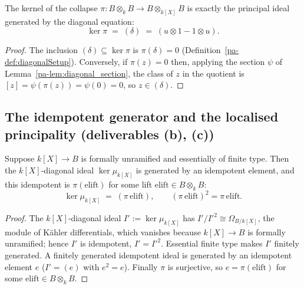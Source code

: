 \begin{theorem}
  \label{pa-thm:ker_baseChange}
  \leanok

  The kernel of the collapse \(\pi \colon B \otimes_k B \to B \otimes_{k[X]} B\) is exactly the
  principal ideal generated by the diagonal equation:
  \[
    \ker \pi \;=\; (\delta) \;=\; (u \otimes 1 - 1 \otimes u).
  \]
\end{theorem}
\begin{proof}
  \leanok
  The inclusion \((\delta) \subseteq \ker \pi\) is \(\pi(\delta) = 0\)
  (Definition~\ref{pa-def:diagonalSetup}). Conversely, if \(\pi(z) = 0\) then, applying the section
  \(\psi\) of Lemma~\ref{pa-lem:diagonal_section}, the class of \(z\) in the quotient is \([z] =
  \psi(\pi(z)) = \psi(0) = 0\), so \(z \in (\delta)\).
\end{proof}

\subsection{The idempotent generator and the localised principality (deliverables (b), (c))}

\begin{theorem}
  \label{pa-thm:exists_idempotent_lift}
  \leanok

  Suppose \(k[X] \to B\) is formally unramified and essentially of finite type. Then the
  \(k[X]\)-diagonal ideal \(\ker \mu_{k[X]}\) is generated by an idempotent element, and this
  idempotent is \(\pi(\mathrm{elift})\) for some lift \(\mathrm{elift} \in B \otimes_k B\):
  \[
    \ker \mu_{k[X]} \;=\; (\pi\,\mathrm{elift}), \qquad (\pi\,\mathrm{elift})^2 = \pi\,\mathrm{elift}.
  \]
\end{theorem}
\begin{proof}
  \leanok
  The \(k[X]\)-diagonal ideal \(I' := \ker \mu_{k[X]}\) has \(I'/I'^2 \cong \Omega_{B/k[X]}\), the
  module of K\"ahler differentials, which vanishes because \(k[X] \to B\) is formally unramified;
  hence \(I'\) is idempotent, \(I' = I'^2\). Essential finite type makes \(I'\) finitely
  generated. A finitely generated idempotent ideal is generated by an idempotent element \(e\)
  (\(I' = (e)\) with \(e^2 = e\)). Finally \(\pi\) is surjective, so \(e = \pi(\mathrm{elift})\)
  for some \(\mathrm{elift} \in B \otimes_k B\).
\end{proof}

